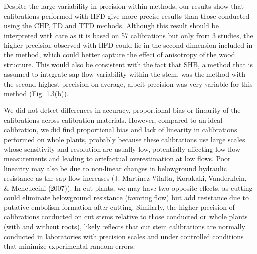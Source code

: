 \documentclass[11pt,twoside]{reedthesis}
\begin{document}
Despite the large variability in precision within methods, our results
show that calibrations performed with HFD give more precise results than
those conducted using the CHP, TD and TTD methods. Although this result
should be interpreted with care as it is based on 57 calibrations but
only from 3 studies, the higher precision observed with HFD could lie in
the second dimension included in the method, which could better capture
the effect of anisotropy of the wood structure. This would also be
consistent with the fact that SHB, a method that is assumed to integrate
sap flow variability within the stem, was the method with the second
highest precision on average, albeit precision was very variable for
this method (Fig. 1.3(b)).\par

We did not detect differences in accuracy, proportional bias or
linearity of the calibrations across calibration materials. However,
compared to an ideal calibration, we did find proportional bias and lack
of linearity in calibrations performed on whole plants, probably because
these calibrations use large scales whose sensitivity and resolution are
usually low, potentially affecting low-flow measurements and leading to
artefactual overestimation at low flows. Poor linearity may also be due
to non-linear changes in belowground hydraulic resistance as the sap
flow increases (J. Martínez-Vilalta, Korakaki, Vanderklein, \&
Mencuccini (2007)). In cut plants, we may have two opposite effects, as
cutting could eliminate belowground resistance (favoring flow) but add
resistance due to putative embolism formation after cutting. Similarly,
the higher precision of calibrations conducted on cut stems relative to
those conducted on whole plants (with and without roots), likely
reflects that cut stem calibrations are normally conducted in
laboratories with precision scales and under controlled conditions that
minimize experimental random errors.\par
\end{document}
